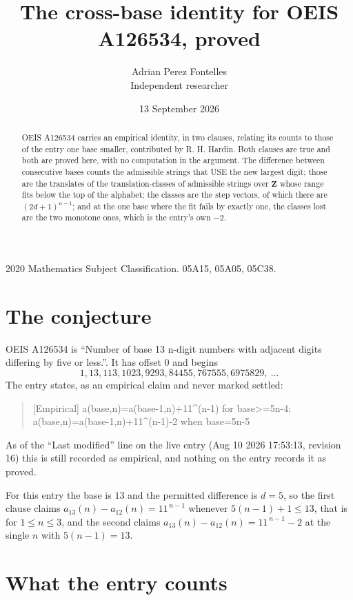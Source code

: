 \documentclass[11pt,a4paper]{article}
\title{The cross-base identity for OEIS A126534, proved}
\author{Adrian Perez Fontelles\\ \small Independent researcher}
\date{13 September 2026}
\theoremstyle{plain}
\theoremstyle{definition}
\begin{document}
\maketitle

\begin{abstract}
OEIS A126534 carries an empirical identity, in two clauses, relating its counts to those of the
entry one base smaller, contributed by R. H. Hardin. Both clauses are true and both are proved
here, with no computation in the argument. The difference between consecutive bases counts the
admissible strings that USE the new largest digit; those are the translates of the
translation-classes of admissible strings over $\mathbf{Z}$ whose range fits below the top of
the alphabet; the classes are the step vectors, of which there are $(2d+1)^{n-1}$; and at the
one base where the fit fails by exactly one, the classes lost are the two monotone ones, which
is the entry's own $-2$.
\end{abstract}

\noindent\small 2020 Mathematics Subject Classification. 05A15, 05A05, 05C38.\normalsize

\section{The conjecture}

OEIS A126534 is ``Number of base 13 n-digit numbers with adjacent digits differing by five or less.''. It has offset $0$ and begins
\[
1, 13, 113, 1023, 9293, 84455, 767555, 6975829,\ \dots
\]
The entry states, as an empirical claim and never marked settled:
\begin{quote}
[Empirical] a(base,n)=a(base-1,n)+11\textasciicircum{}(n-1) for base>=5n-4; a(base,n)=a(base-1,n)+11\textasciicircum{}(n-1)-2 when base=5n-5
\end{quote}
As of the ``Last modified'' line on the live entry (Aug 10 2026 17:53:13, revision 16)
this is still recorded as empirical, and nothing on the entry records it as proved.

For this entry the base is $13$ and the permitted difference is $d=5$, so the first clause
claims $a_{13}(n)-a_{12}(n)=11^{\,n-1}$ whenever $5(n-1)+1\le13$, that is for
$1\le n\le3$, and the second claims $a_{13}(n)-a_{12}(n)=11^{\,n-1}-2$ at the single
$n$ with $5(n-1)=13$.

\section{What the entry counts}
\end{document}
